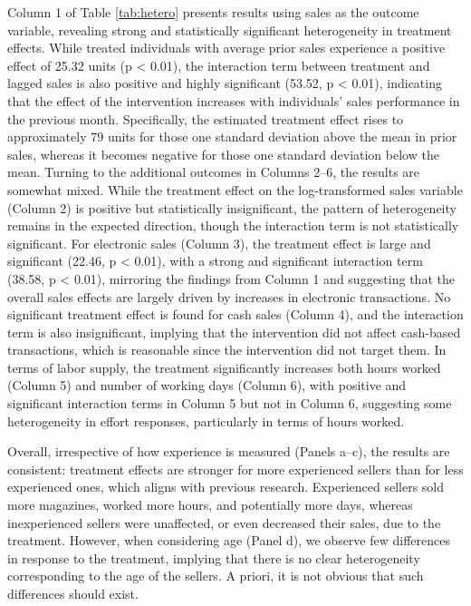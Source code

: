 \documentclass[12pt]{article}
\begin{document}
Column 1 of Table \ref{tab:hetero} presents results using sales as the outcome variable, revealing strong and statistically significant heterogeneity in treatment effects. While treated individuals with average prior sales experience a positive effect of 25.32 units (p < 0.01), the interaction term between treatment and lagged sales is also positive and highly significant (53.52, p < 0.01), indicating that the effect of the intervention increases with individuals’ sales performance in the previous month. Specifically, the estimated treatment effect rises to approximately 79 units for those one standard deviation above the mean in prior sales, whereas it becomes negative for those one standard deviation below the mean. Turning to the additional outcomes in Columns 2–6, the results are somewhat mixed. While the treatment effect on the log-transformed sales variable (Column 2) is positive but statistically insignificant, the pattern of heterogeneity remains in the expected direction, though the interaction term is not statistically significant. For electronic sales (Column 3), the treatment effect is large and significant (22.46, p < 0.01), with a strong and significant interaction term (38.58, p < 0.01), mirroring the findings from Column 1 and suggesting that the overall sales effects are largely driven by increases in electronic transactions. No significant treatment effect is found for cash sales (Column 4), and the interaction term is also insignificant, implying that the intervention did not affect cash-based transactions, which is reasonable since the intervention did not target them. In terms of labor supply, the treatment significantly increases both hours worked (Column 5) and number of working days (Column 6), with positive and significant interaction terms in Column 5 but not in Column 6, suggesting some heterogeneity in effort responses, particularly in terms of hours worked.

Overall, irrespective of how experience is measured (Panels a–c), the results are consistent: treatment effects are stronger for more experienced sellers than for less experienced ones, which aligns with previous research. Experienced sellers sold more magazines, worked more hours, and potentially more days, whereas inexperienced sellers were unaffected, or even decreased their sales, due to the treatment. However, when considering age (Panel d), we observe few differences in response to the treatment, implying that there is no clear heterogeneity corresponding to the age of the sellers. A priori, it is not obvious that such differences should exist.
\end{document}

